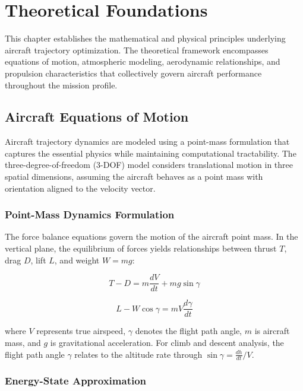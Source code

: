 \chapter{Theoretical Foundations}

This chapter establishes the mathematical and physical principles underlying aircraft trajectory optimization. The theoretical framework encompasses equations of motion, atmospheric modeling, aerodynamic relationships, and propulsion characteristics that collectively govern aircraft performance throughout the mission profile.

\section{Aircraft Equations of Motion}

Aircraft trajectory dynamics are modeled using a point-mass formulation that captures the essential physics while maintaining computational tractability. The three-degree-of-freedom (3-DOF) model considers translational motion in three spatial dimensions, assuming the aircraft behaves as a point mass with orientation aligned to the velocity vector.

\subsection{Point-Mass Dynamics Formulation}

The force balance equations govern the motion of the aircraft point mass. In the vertical plane, the equilibrium of forces yields relationships between thrust $T$, drag $D$, lift $L$, and weight $W = mg$:

\begin{equation}
T - D = m\frac{dV}{dt} + mg\sin\gamma
\end{equation}

\begin{equation}
L - W\cos\gamma = mV\frac{d\gamma}{dt}
\end{equation}

where $V$ represents true airspeed, $\gamma$ denotes the flight path angle, $m$ is aircraft mass, and $g$ is gravitational acceleration. For climb and descent analysis, the flight path angle $\gamma$ relates to the altitude rate through $\sin\gamma = \frac{dh}{dt}/V$.

\subsection{Energy-State Approximation}

